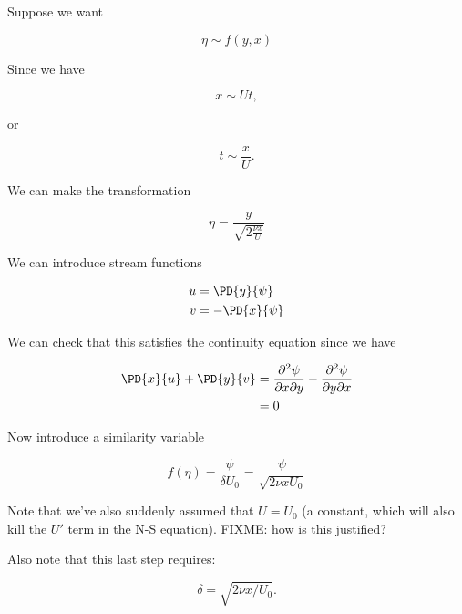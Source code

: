 Suppose we want

\begin{equation}\label{eqn:continuumL19:250}
\eta \sim f(y, x)
\end{equation}

Since we have

\begin{equation}\label{eqn:continuumL19:270}
x \sim U t,
\end{equation}

or

\begin{equation}\label{eqn:continuumL19:290}
t \sim \frac{x}{U}.
\end{equation}

We can make the transformation

\begin{equation}\label{eqn:continuumL19:310}
\eta = \frac{y}{\sqrt{2 \frac{\nu x}{U}}}
\end{equation}

We can introduce stream functions

\begin{align}\label{eqn:continuumProblemSet2:330}
u &= \PD{y}{\psi} \\
v &= -\PD{x}{\psi}
\end{align}

We can check that this satisfies the continuity equation since we have

\begin{align*}
\PD{x}{u} + \PD{y}{v} 
&=
\frac{\partial^2 \psi}{\partial x \partial y}
-\frac{\partial^2 \psi}{\partial y \partial x} \\
&= 0
\end{align*}

Now introduce a similarity variable 

\begin{equation}\label{eqn:continuumL19:350}
f(\eta) = \frac{\psi}{\delta U_0} = \frac{\psi}{\sqrt{2 \nu x U_0}}
\end{equation}

Note that we've also suddenly assumed that $U = U_0$ (a constant, which will also kill the $U'$ term in the N-S equation).  FIXME: how is this justified?

Also note that this last step requires:

\begin{equation}\label{eqn:continuumL19:730}
\delta = \sqrt{ 2 \nu x/U_0 }.
\end{equation}

